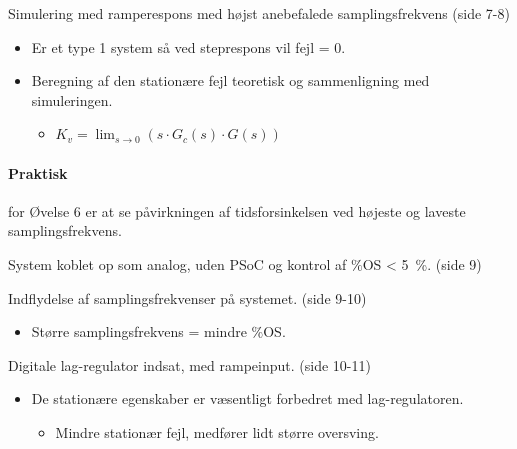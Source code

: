 \documentclass[danish]{article}
\begin{document}
\vspace{3mm}
Simulering med ramperespons med højst anebefalede samplingsfrekvens (side 7-8)
\begin{itemize}
	\item Er et type 1 system så ved steprespons vil fejl = 0.
	\item Beregning af den stationære fejl teoretisk og sammenligning med simuleringen.
	\begin{itemize}
		\item $K_v =\lim_{s\rightarrow 0}(s\cdot G_c(s)\cdot G(s))$
	\end{itemize}
\end{itemize}

\paragraph{Praktisk} for Øvelse 6 er at se påvirkningen af tidsforsinkelsen ved højeste og laveste samplingsfrekvens. 

\vspace{3mm}
System koblet op som analog, uden PSoC og kontrol af $\si{\percent}$OS < \SI{5}{\percent}. (side 9)

\vspace{3mm}
Indflydelse af samplingsfrekvenser på systemet. (side 9-10)
\begin{itemize}
	\item Større samplingsfrekvens = mindre $\si{\percent}$OS.
\end{itemize}
\vspace{3mm}
Digitale lag-regulator indsat, med rampeinput. (side 10-11)
\begin{itemize}
	\item De stationære egenskaber er væsentligt forbedret med lag-regulatoren.
	\begin{itemize}
		\item Mindre stationær fejl, medfører lidt større oversving.
	\end{itemize}
\end{itemize}
\end{document}
